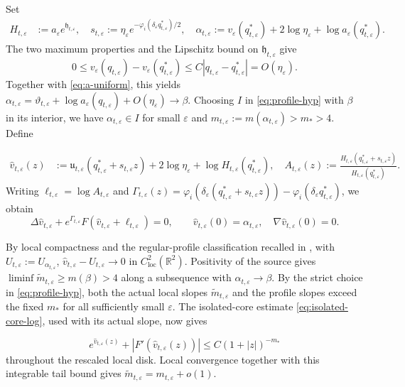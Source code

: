 \documentclass[11pt,reqno]{amsart}
\numberwithin{equation}{section}
\theoremstyle{definition}
\theoremstyle{remark}
\newcommand{\R}{\mathbb R}
\newcommand{\eps}{\varepsilon}
\newcommand{\etae}{\eta_{\eps}}
\newcommand{\de}{\delta_{\eps}}
\newcommand{\loc}{\mathrm{loc}}
\begin{document}
Set
\begin{equation}\label{eq:H-alpha-local}
 \begin{aligned}
 H_{t,\eps}&:=a_\eps e^{\mathfrak h_{t,\eps}},\quad
 s_{t,\eps}:=\etae e^{-\varphi_i(\de q_{t,\eps}^*)/2},\quad
\alpha_{t,\eps}:=v_\eps(q_{t,\eps}^*)+2\log\etae
                   +\log a_\eps(q_{t,\eps}^*).
 \end{aligned}
\end{equation}
The two maximum properties and the Lipschitz bound on $\mathfrak h_{t,\eps}$ give
\[
 0\le v_\eps(q_{t,\eps})-v_\eps(q_{t,\eps}^*)
 \le C|q_{t,\eps}-q_{t,\eps}^*|=O(\etae).
\]
Together with \eqref{eq:a-uniform}, this yields
$\alpha_{t,\eps}=\vartheta_{t,\eps}
+\log a_\eps(q_{t,\eps})+O(\etae)\to\beta$.
Choosing $I$ in \eqref{eq:profile-hyp} with $\beta$ in its interior,
we have $\alpha_{t,\eps}\in I$ for small $\eps$ and
$m_{t,\eps}:=m(\alpha_{t,\eps})>m_*>4$. Define {
\begin{align}
\widehat v_{t,\eps}(z)
  &:={\mathfrak u}_{t,\eps}(q_{t,\eps}^*+s_{t,\eps}z)
    +2\log\etae+\log H_{t,\eps}(q_{t,\eps}^*),
    \quad
  A_{t,\eps}(z)
   :=\frac{H_{t,\eps}(q_{t,\eps}^*+s_{t,\eps}z)}
  {H_{t,\eps}(q_{t,\eps}^*)}.
  \label{eq:A-local}
\end{align}
Writing $\ell_{t,\eps}=\log A_{t,\eps}$ and
$\Gamma_{t,\eps}(z)=\varphi_i(\de(q_{t,\eps}^*+s_{t,\eps}z))
-\varphi_i(\de q_{t,\eps}^*)$, we obtain
\begin{equation}\label{eq:local-rescaled-equation}
 \Delta\widehat v_{t,\eps}+e^{\Gamma_{t,\eps}}
 F(\widehat v_{t,\eps}+\ell_{t,\eps})=0,\qquad
 \widehat v_{t,\eps}(0)=\alpha_{t,\eps},\quad
 \nabla\widehat v_{t,\eps}(0)=0.
\end{equation}

By local compactness and the regular-profile classification recalled
in \cite[pp.~840--841]{CKL}, with
$U_{t,\eps}:=U_{\alpha_{t,\eps}}$,
$\widehat v_{t,\eps}-U_{t,\eps}\to0$ in $C^2_{\loc}(\R^2)$.
Positivity of the source gives
$\liminf\widetilde m_{t,\eps}\ge m(\beta)>4$ along a subsequence
with $\alpha_{t,\eps}\to\beta$.
By the strict choice in \eqref{eq:profile-hyp}, both the actual local
slopes $\widetilde m_{t,\eps}$ and the profile slopes exceed the fixed
$m_*$ for all sufficiently small $\eps$.
The isolated-core estimate \eqref{eq:isolated-core-log}, used
with its actual slope, now gives}
\begin{equation}
  e^{\widehat v_{t,\eps}(z)}
  +|F'(\widehat v_{t,\eps}(z))|
  \le C(1+|z|)^{-m_*}
  \label{eq:scaled-source-decay}
\end{equation}
throughout the rescaled local disk. Local convergence together with
this integrable tail bound gives
$\widetilde m_{t,\eps}=m_{t,\eps}+o(1)$.
\end{document}
